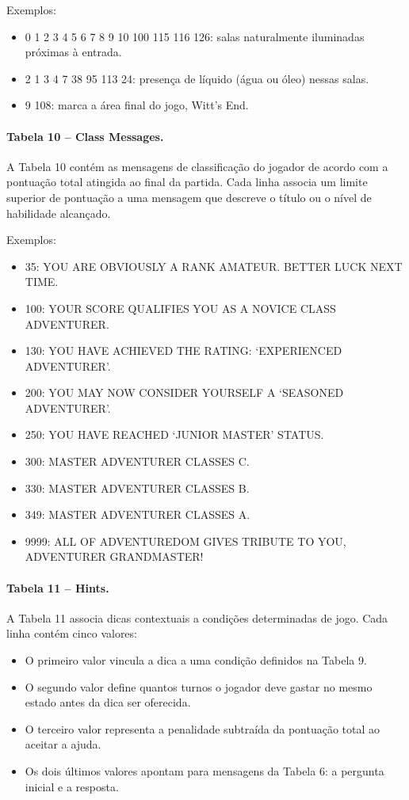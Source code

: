 \documentclass[12pt,a4paper]{article}
\begin{document}
Exemplos:
\begin{itemize}
  \item 0 1 2 3 4 5 6 7 8 9 10 100 115 116 126: salas naturalmente iluminadas próximas à entrada.
  \item 2 1 3 4 7 38 95 113 24: presença de líquido (água ou óleo) nessas salas.
  \item 9 108: marca a área final do jogo, Witt’s End.
\end{itemize}

\paragraph{Tabela 10 – Class Messages.}
A Tabela 10 contém as mensagens de classificação do jogador de acordo com a pontuação total atingida ao final da partida. Cada linha associa um limite superior de pontuação a uma mensagem que descreve o título ou o nível de habilidade alcançado.  

Exemplos:
\begin{itemize}
  \item 35: YOU ARE OBVIOUSLY A RANK AMATEUR.  BETTER LUCK NEXT TIME.
  \item 100: YOUR SCORE QUALIFIES YOU AS A NOVICE CLASS ADVENTURER.
  \item 130: YOU HAVE ACHIEVED THE RATING: ‘EXPERIENCED ADVENTURER’.
  \item 200: YOU MAY NOW CONSIDER YOURSELF A ‘SEASONED ADVENTURER’.
  \item 250: YOU HAVE REACHED ‘JUNIOR MASTER’ STATUS.
  \item 300: MASTER ADVENTURER CLASSES C.
  \item 330: MASTER ADVENTURER CLASSES B.
  \item 349: MASTER ADVENTURER CLASSES A.
  \item 9999: ALL OF ADVENTUREDOM GIVES TRIBUTE TO YOU, ADVENTURER GRANDMASTER!
\end{itemize}

\paragraph{Tabela 11 – Hints.}
A Tabela 11 associa dicas contextuais a condições determinadas de jogo.  
Cada linha contém cinco valores:  

\begin{itemize}
  \item O primeiro valor vincula a dica a uma condição definidos na Tabela 9.
  \item O segundo valor define quantos turnos o jogador deve gastar no mesmo estado antes da dica ser oferecida.
  \item O terceiro valor representa a penalidade subtraída da pontuação total ao aceitar a ajuda.
  \item Os dois últimos valores apontam para mensagens da Tabela 6: a pergunta inicial e a resposta.
\end{itemize}
\end{document}
